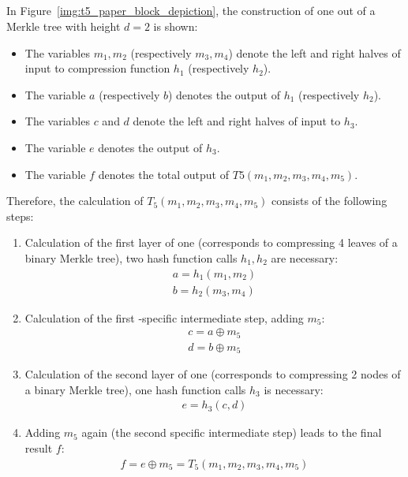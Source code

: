 \subsection{\texorpdfstring{\tfblock}{T5-Block}}
\label{sec:t5_block}
In Figure~\ref{img:t5_paper_block_depiction}, the construction of one \textit{\tfblock} out of a Merkle tree with height $d=2$ is shown:

\begin{itemize}
\item The variables  $m_1, m_2$ (respectively $m_3, m_4$) denote the left and right halves of input to compression function $h_1$ (respectively $h_2$).
\item The variable $a$ (respectively $b$) denotes the output of $h_1$ (respectively $h_2$).
\item The variables $c$ and $d$ denote the left and right halves of input to $h_3$.
\item The variable $e$ denotes the output of $h_3$.
\item The variable $f$ denotes the total output of $T5(m_1, m_2, m_3, m_4, m_5)$.
\end{itemize}
Therefore, the calculation of $T_5(m_1, m_2, m_3, m_4, m_5)$ consists of the following steps:
\begin{enumerate}
\item Calculation of the first layer of one \tfblock(corresponds to compressing 4 leaves of a binary Merkle tree), two hash function calls $h_1, h_2$ are necessary:
\begin{align}
a = h_1(m_1, m_2) \\
b = h_2(m_3, m_4)
\end{align}

\item Calculation of the first \tf-specific intermediate step, adding $m_5$:
\begin{align}
c = a \oplus m_5 \\
d = b \oplus m_5
\end{align}

\item Calculation of the second layer of one \tfblock (corresponds to compressing 2 nodes of a binary Merkle tree), one hash function calls $h_3$ is necessary:
\begin{align}
e = h_3(c,d)
\end{align}

\item Adding $m_5$ again (the second \tf specific intermediate step) leads to the final result $f$:
\begin{align}
f = e \oplus m_5 = T_5(m_1, m_2, m_3, m_4, m_5)
\end{align}
\end{enumerate}

